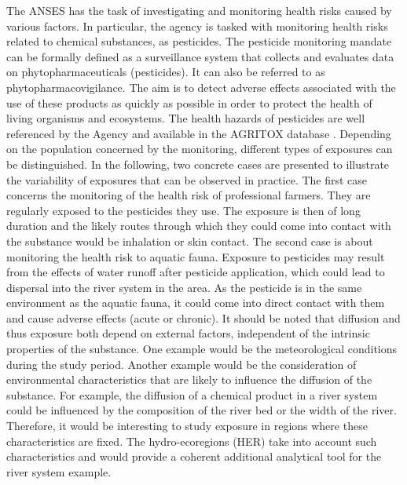 The ANSES has the task of investigating and monitoring health risks caused by various factors. In particular, the agency is tasked with monitoring health risks related to chemical substances, as pesticides. The pesticide monitoring mandate can be formally defined as a surveillance system that collects and evaluates data on phytopharmaceuticals (pesticides). It can also be referred to as phytopharmacovigilance. The aim is to detect adverse effects associated with the use of these products as quickly as possible in order to protect the health of living organisms and ecosystems. The health hazards of pesticides are well referenced by the Agency and available in the AGRITOX database \citep{AGRITOX}. Depending on the population concerned by the monitoring, different types of exposures can be distinguished. In the following, two concrete cases are presented to illustrate the variability of exposures that can be observed in practice. The first case concerns the monitoring of the health risk of professional farmers. They are regularly exposed to the pesticides they use. The exposure is then of long duration and the likely routes through which they could come into contact with the substance would be inhalation or skin contact. The second case is about monitoring the health risk to aquatic fauna. Exposure to pesticides may result from the effects of water runoff after pesticide application, which could lead to dispersal into the river system in the area. As the pesticide is in the same environment as the aquatic fauna, it could come into direct contact with them and cause adverse effects (acute or chronic). It should be noted that diffusion and thus exposure both depend on external factors, independent of the intrinsic properties of the substance. One example would be the meteorological conditions during the study period. Another example would be the consideration of environmental characteristics that are likely to influence the diffusion of the substance. For example, the diffusion of a chemical product in a river system could be influenced by the composition of the river bed or the width of the river. Therefore, it would be interesting to study exposure in regions where these characteristics are fixed. The hydro-ecoregions (HER) take into account such characteristics and would provide a coherent additional analytical tool for the river system example.           

